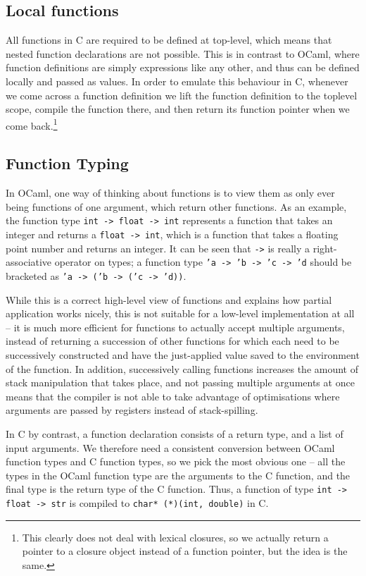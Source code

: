 \documentclass[12pt,a4paper,twoside,openright]{report}
\begin{document}
\subsection{Local functions}

All functions in C are required to be defined at top-level, which means that 
nested function declarations are not possible. This is in contrast to OCaml, 
where function definitions are simply expressions like any other, and thus can 
be defined locally and passed as values. In order to emulate this behaviour in 
C, whenever we come across a function definition we lift the function 
definition to the toplevel scope, compile the function there, and then return 
its function pointer when we come back.\footnote{This clearly does not deal 
with lexical closures, so we actually return a pointer to a closure object 
instead of a function pointer, but the idea is the same.}

\subsection{Function Typing} \label{function-typing}

In OCaml, one way of thinking about functions is to view them as only ever 
being functions of one argument, which return other functions. As an example, 
the function type \texttt{int -> float -> int} represents a function that takes 
an integer and returns a \texttt{float -> int}, which is a function that takes 
a floating point number and returns an integer. It can be seen that \texttt{->} 
is really a right-associative operator on types; a function type \texttt{'a -> 
'b -> 'c -> 'd} should be bracketed as \texttt{'a -> ('b -> ('c -> 'd))}.

While this is a correct high-level view of functions and explains how partial 
application works nicely, this is not suitable for a low-level implementation 
at all -- it is much more efficient for functions to actually accept multiple 
arguments, instead of returning a succession of other functions for which each 
need to be successively constructed and have the just-applied value saved to 
the environment of the function. In addition, successively calling functions 
increases the amount of stack manipulation that takes place, and not passing 
multiple arguments at once means that the compiler is not able to take 
advantage of optimisations where arguments are passed by registers instead of 
stack-spilling.

In C by contrast, a function declaration consists of a return type, and a list 
of input arguments. We therefore need a consistent conversion between OCaml 
function types and C function types, so we pick the most obvious one -- all the 
types in the OCaml function type are the arguments to the C function, and the 
final type is the return type of the C function. Thus, a function of type 
\texttt{int -> float -> str} is compiled to \texttt{char* (*)(int, double)} in 
C.
\end{document}
